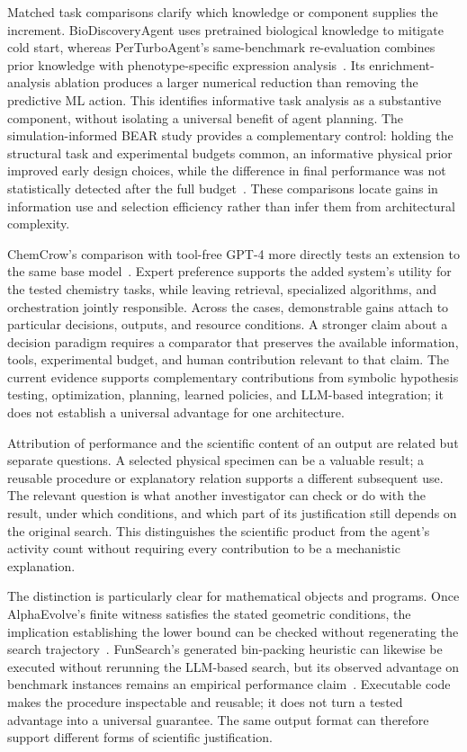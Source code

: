 Matched task comparisons clarify which knowledge or component supplies the increment. BioDiscoveryAgent uses pretrained biological knowledge to mitigate cold start, whereas PerTurboAgent's same-benchmark re-evaluation combines prior knowledge with phenotype-specific expression analysis~\cite{asd0020,asd0034}. Its enrichment-analysis ablation produces a larger numerical reduction than removing the predictive ML action. This identifies informative task analysis as a substantive component, without isolating a universal benefit of agent planning. The simulation-informed BEAR study provides a complementary control: holding the structural task and experimental budgets common, an informative physical prior improved early design choices, while the difference in final performance was not statistically detected after the full budget~\cite{asd0615}. These comparisons locate gains in information use and selection efficiency rather than infer them from architectural complexity.

ChemCrow's comparison with tool-free GPT-4 more directly tests an extension to the same base model~\cite{bran2024}. Expert preference supports the added system's utility for the tested chemistry tasks, while leaving retrieval, specialized algorithms, and orchestration jointly responsible. Across the cases, demonstrable gains attach to particular decisions, outputs, and resource conditions. A stronger claim about a decision paradigm requires a comparator that preserves the available information, tools, experimental budget, and human contribution relevant to that claim. The current evidence supports complementary contributions from symbolic hypothesis testing, optimization, planning, learned policies, and LLM-based integration; it does not establish a universal advantage for one architecture.

Attribution of performance and the scientific content of an output are related but separate questions. A selected physical specimen can be a valuable result; a reusable procedure or explanatory relation supports a different subsequent use. The relevant question is what another investigator can check or do with the result, under which conditions, and which part of its justification still depends on the original search. This distinguishes the scientific product from the agent's activity count without requiring every contribution to be a mechanistic explanation.

The distinction is particularly clear for mathematical objects and programs. Once AlphaEvolve's finite witness satisfies the stated geometric conditions, the implication establishing the lower bound can be checked without regenerating the search trajectory~\cite{asd0063}. FunSearch's generated bin-packing heuristic can likewise be executed without rerunning the LLM-based search, but its observed advantage on benchmark instances remains an empirical performance claim~\cite{asd0512}. Executable code makes the procedure inspectable and reusable; it does not turn a tested advantage into a universal guarantee. The same output format can therefore support different forms of scientific justification.

